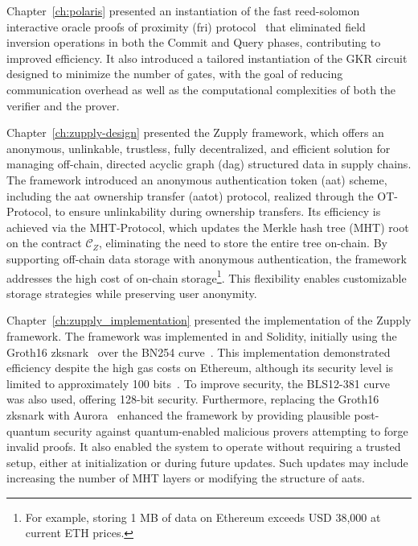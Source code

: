 Chapter~\ref{ch:polaris} presented an instantiation of the fast reed-solomon interactive oracle proofs of proximity (\gls{fri}) protocol~\cite{FRI2018} that eliminated field inversion operations in both the Commit and Query phases, contributing to improved efficiency. It also introduced a tailored instantiation of the GKR circuit designed to minimize the number of gates, with the goal of reducing communication overhead as well as the computational complexities of both the verifier and the prover.

Chapter~\ref{ch:zupply-design} presented the Zupply framework, which offers an anonymous, unlinkable, trustless, fully decentralized, and efficient solution for managing off-chain, directed acyclic graph (\gls{dag}) structured data in supply chains. The framework introduced an anonymous authentication token (\gls{aat}) scheme, including the \gls{aat} ownership transfer (\gls{aatot}) protocol, realized through the \textsf{OT-Protocol}, to ensure unlinkability during ownership transfers. Its efficiency is achieved via the \textsf{MHT-Protocol}, which updates the Merkle hash tree (\textsf{MHT}) root on the contract $\mathcal{C}_Z$, eliminating the need to store the entire tree on-chain. By supporting off-chain data storage with anonymous authentication, the framework addresses the high cost of on-chain storage\footnote{For example, storing 1 MB of data on Ethereum exceeds USD 38,000 at current ETH prices.}. This flexibility enables customizable storage strategies while preserving user anonymity.

Chapter~\ref{ch:zupply_implementation} presented the implementation of the Zupply framework. The framework was implemented in \CC and Solidity, initially using the Groth16 \gls{zksnark}~\cite{Groth2016} over the BN254 curve~\cite{BNcurve}. This implementation demonstrated efficiency despite the high gas costs on Ethereum, although its security level is limited to approximately 100 bits~\cite{Barbulescu2019}. To improve security, the BLS12-381 curve~\cite{BLS_curve2003} was also used, offering 128-bit security. Furthermore, replacing the Groth16 \gls{zksnark} with Aurora~\cite{Aurora2019} enhanced the framework by providing plausible post-quantum security against quantum-enabled malicious provers attempting to forge invalid proofs. It also enabled the system to operate without requiring a trusted setup, either at initialization or during future updates. Such updates may include increasing the number of \textsf{MHT} layers or modifying the structure of \glspl{aat}.







